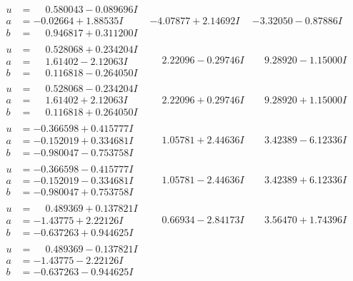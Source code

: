 \documentclass[1p]{elsarticle_modified}
\theoremstyle{definition}
\begin{document}
$$\begin{array}{c|c|c}
\begin{aligned}
u &= \phantom{-}0.580043 - 0.089696 I \\
a &= -0.02664 + 1.88535 I \\
b &= \phantom{-}0.946817 + 0.311200 I\end{aligned}
 & -4.07877 + 2.14692 I & -3.32050 - 0.87886 I \\ \hline\begin{aligned}
u &= \phantom{-}0.528068 + 0.234204 I \\
a &= \phantom{-}1.61402 - 2.12063 I \\
b &= \phantom{-}0.116818 - 0.264050 I\end{aligned}
 & \phantom{-}2.22096 - 0.29746 I & \phantom{-}9.28920 - 1.15000 I \\ \hline\begin{aligned}
u &= \phantom{-}0.528068 - 0.234204 I \\
a &= \phantom{-}1.61402 + 2.12063 I \\
b &= \phantom{-}0.116818 + 0.264050 I\end{aligned}
 & \phantom{-}2.22096 + 0.29746 I & \phantom{-}9.28920 + 1.15000 I \\ \hline\begin{aligned}
u &= -0.366598 + 0.415777 I \\
a &= -0.152019 + 0.334681 I \\
b &= -0.980047 - 0.753758 I\end{aligned}
 & \phantom{-}1.05781 + 2.44636 I & \phantom{-}3.42389 - 6.12336 I \\ \hline\begin{aligned}
u &= -0.366598 - 0.415777 I \\
a &= -0.152019 - 0.334681 I \\
b &= -0.980047 + 0.753758 I\end{aligned}
 & \phantom{-}1.05781 - 2.44636 I & \phantom{-}3.42389 + 6.12336 I \\ \hline\begin{aligned}
u &= \phantom{-}0.489369 + 0.137821 I \\
a &= -1.43775 + 2.22126 I \\
b &= -0.637263 + 0.944625 I\end{aligned}
 & \phantom{-}0.66934 - 2.84173 I & \phantom{-}3.56470 + 1.74396 I \\ \hline\begin{aligned}
u &= \phantom{-}0.489369 - 0.137821 I \\
a &= -1.43775 - 2.22126 I \\
b &= -0.637263 - 0.944625 I\end{aligned}

\end{array}$$
\end{document}
